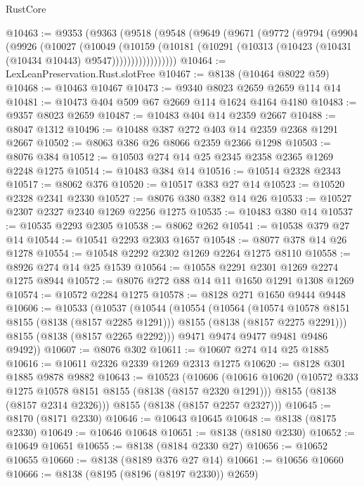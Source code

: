 \begin{lexlean}{RustCore}
\begin{coremodule}
@10463 := @9353
    (@9363
      (@9518
        (@9548
          (@9649
            (@9671
              (@9772
                (@9794
                  (@9904
                    (@9926
                      (@10027
                        (@10049
                          (@10159
                            (@10181
                              (@10291 (@10313 (@10423 (@10431 (@10434 @10443) @9547)))))))))))))))))
@10464 := LexLeanPreservation.Rust.slotFree
@10467 := @8138 (@10464 @8022 @59)
@10468 := @10463 @10467
@10473 := @9340 @8023 @2659 @2659 @114 @14
@10481 := @10473 @404 @509 @67 @2669 @114 @1624 @4164 @4180
@10483 := @9357 @8023 @2659
@10487 := @10483 @404 @14 @2359 @2667
@10488 := @8047 @1312
@10496 := @10488 @387 @272 @403 @14 @2359 @2368 @1291 @2667
@10502 := @8063 @386 @26 @8066 @2359 @2366 @1298
@10503 := @8076 @384
@10512 := @10503 @274 @14 @25 @2345 @2358 @2365 @1269 @2248 @1275
@10514 := @10483 @384 @14
@10516 := @10514 @2328 @2343
@10517 := @8062 @376
@10520 := @10517 @383 @27 @14
@10523 := @10520 @2328 @2341 @2330
@10527 := @8076 @380 @382 @14 @26
@10533 := @10527 @2307 @2327 @2340 @1269 @2256 @1275
@10535 := @10483 @380 @14
@10537 := @10535 @2293 @2305
@10538 := @8062 @262
@10541 := @10538 @379 @27 @14
@10544 := @10541 @2293 @2303 @1657
@10548 := @8077 @378 @14 @26 @1278
@10554 := @10548 @2292 @2302 @1269 @2264 @1275 @8110
@10558 := @8926 @274 @14 @25 @1539
@10564 := @10558 @2291 @2301 @1269 @2274 @1275 @8944
@10572 := @8076 @272 @88 @14 @11 @1650 @1291 @1308 @1269
@10574 := @10572 @2284 @1275
@10578 := @8128 @271 @1650 @9444 @9448
@10606 := @10533
    (@10537
      (@10544
        (@10554
          (@10564
            (@10574 @10578 @8151 @8155 (@8138 (@8157 @2285 @1291)))
            @8155
            (@8138 (@8157 @2275 @2291)))
          @8155
          (@8138 (@8157 @2265 @2292)))
        @9471
        @9474
        @9477
        @9481
        @9486
        @9492))
@10607 := @8076 @302
@10611 := @10607 @274 @14 @25 @1885
@10616 := @10611 @2326 @2339 @1269 @2313 @1275
@10620 := @8128 @301 @1885 @9878 @9882
@10643 := @10523
    (@10606
      (@10616
        @10620
        (@10572 @333 @1275 @10578 @8151 @8155 (@8138 (@8157 @2320 @1291)))
        @8155
        (@8138 (@8157 @2314 @2326)))
      @8155
      (@8138 (@8157 @2257 @2327)))
@10645 := @8170 (@8171 @2330)
@10646 := @10643 @10645
@10648 := @8138 (@8175 @2330)
@10649 := @10646 @10648
@10651 := @8138 (@8180 @2330)
@10652 := @10649 @10651
@10655 := @8138 (@8184 @2330 @27)
@10656 := @10652 @10655
@10660 := @8138 (@8189 @376 @27 @14)
@10661 := @10656 @10660
@10666 := @8138 (@8195 (@8196 (@8197 @2330)) @2659)

\end{coremodule}
\end{lexlean}
